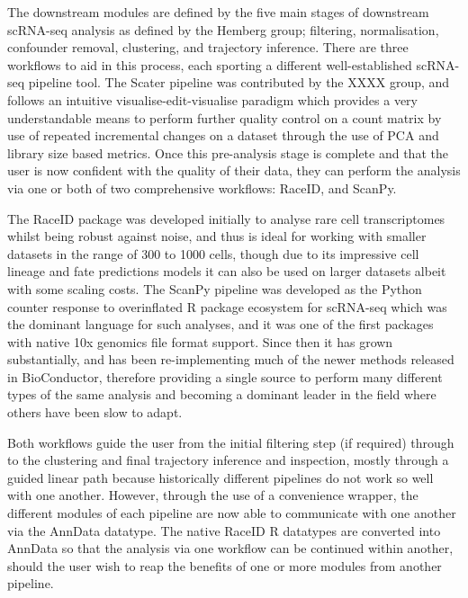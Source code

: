 \documentclass[a4paper,num-refs]{oup-contemporary}
\begin{document}



The downstream modules are defined by the five main stages of downstream scRNA-seq analysis as defined by the Hemberg group; filtering, normalisation, confounder removal, clustering, and trajectory inference. There are three workflows to aid in this process, each sporting a different well-established scRNA-seq pipeline tool. The Scater pipeline was contributed by the XXXX group, and follows an intuitive visualise-edit-visualise paradigm which provides a very understandable means to perform further quality control on a count matrix by use of repeated incremental changes on a dataset through the use of PCA and library size based metrics. Once this pre-analysis stage is complete and that the user is now confident with the quality of their data, they can perform the analysis via one or both of two comprehensive workflows: RaceID, and ScanPy.

The RaceID package was developed initially to analyse rare cell transcriptomes whilst being robust against noise, and thus is ideal for working with smaller datasets in the range of 300 to 1000 cells, though due to its impressive cell lineage and fate predictions models it can also be used on larger datasets albeit with some scaling costs. The ScanPy pipeline was developed as the Python counter response to overinflated R package ecosystem for scRNA-seq which was the dominant language for such analyses, and it was one of the first packages with native 10x genomics file format support. Since then it has grown substantially, and has been re-implementing much of the newer methods released in BioConductor, therefore providing a single source to perform many different types of the same analysis and becoming a dominant leader in the field where others have been slow to adapt.


Both workflows guide the user from the initial filtering step (if required) through to the clustering and final trajectory inference and inspection, mostly through a guided linear path because historically different pipelines do not work so well with one another.
However, through the use of a convenience wrapper, the different modules of each pipeline are now able to communicate with one another via the AnnData datatype. The native RaceID R datatypes are converted into AnnData so that the analysis via one workflow can be continued within another, should the user wish to reap the benefits of one or more modules from another pipeline.
\end{document}
